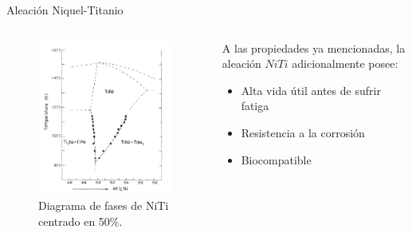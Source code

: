 \documentclass[11pt]{beamer}
\begin{document}
		\begin{frame}{Aleación Niquel-Titanio}
			\begin{columns}[T]
				\begin{column}{.49\textwidth}
					\begin{figure}[H]
					\centering
					\includegraphics[scale=0.25]{img/NiTiphasediagram.png}
					\caption*{Diagrama de fases de NiTi centrado en 50\%.}
					\end{figure}
				\end{column}
				\begin{column}{.49\textwidth}
				A las propiedades ya mencionadas, la aleación $NiTi$ adicionalmente posee:
					\begin{itemize}
						\item Alta vida útil antes de sufrir fatiga
						\item Resistencia a la corrosión
						\item Biocompatible
					\end{itemize}
				\end{column}
			\end{columns}
		\end{frame}
		
\end{document}
